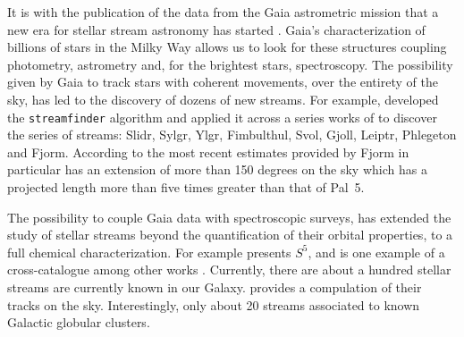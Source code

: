 \documentclass[draft]{aa}
\begin{document}
  
  It is with the publication of the data from the Gaia astrometric mission \citep{2016A&A...595A...1G} that a new era for stellar stream astronomy has started  \citep{2024arXiv240519410B}. Gaia's characterization of billions of stars in the Milky Way allows us to look for these structures coupling photometry, astrometry and, for the brightest stars, spectroscopy. The possibility given by Gaia to track stars with coherent movements, over the entirety of the sky, has led to the discovery of dozens of new streams. For example, \citet{2018MNRAS.477.4063M} developed the \texttt{streamfinder} algorithm and applied it across a series works of \citep{2018MNRAS.481.3442M,  2018ApJ...865...85I, 2019ApJ...872..152I} to discover the series of streams: Slidr, Sylgr, Ylgr, Fimbulthul, Svol, Gjoll, Leiptr, Phlegeton and Fjorm.  According to the most recent estimates provided by \citet{2020MNRAS.493.4978S} Fjorm in particular has an extension of more than 150 degrees on the sky which has a projected length more than five times greater than that of Pal~5. 
  
  The possibility to couple Gaia data with spectroscopic surveys, has extended the study of stellar streams beyond the quantification of their orbital properties, to a full chemical characterization. For example \citet{2019MNRAS.490.3508L} presents $S^5$, and is one example of a cross-catalogue among other works \citep{2020AJ....160..181J, 2021ApJ...911..149L, 2022ApJ...928...30L, 2024MNRAS.529.2413U}. Currently, there are about a hundred stellar streams are currently known in our Galaxy. \citet{2023MNRAS.520.5225M} provides a compulation of their tracks on the sky. Interestingly, only about 20 streams associated to known Galactic globular clusters.
\end{document}
